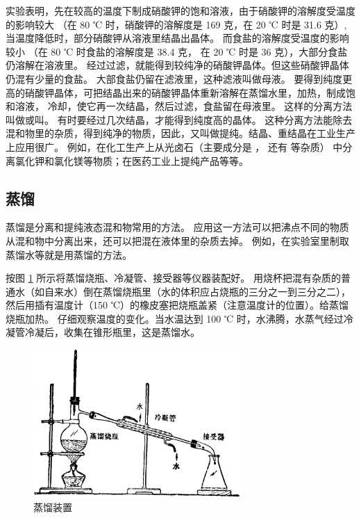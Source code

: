 实验表明，先在较高的温度下制成硝酸钾的饱和溶液，由于硝酸钾的溶解度受温度的影响较大
（在 80 ℃ 时，硝酸钾的溶解度是 169 克，在 20 ℃ 时是 31.6 克）,
当温度降低时，部分硝酸钾从溶液里结晶出晶体。
而食盐的溶解度受温度的影响较小
（在 80 ℃ 时食盐的溶解度是 38.4 克， 在 20 ℃ 时是 36 克），大部分食盐仍溶解在溶液里。
经过过滤，就能得到较纯净的硝酸钾晶体。但这些硝酸钾晶体仍混有少量的食盐。
大部食盐仍留在滤液里，这种滤液叫做母液。
要得到纯度更高的硝酸钾晶体，可把结晶出来的硝酸钾晶体重新溶解在蒸馏水里，加热，制成饱和溶液，
冷却，使它再一次结晶，然后过滤，食盐留在母液里。
这样的分离方法叫做或叫。
有时要经过几次结晶，才能得到纯度高的晶体。
这种分离方法能除去混和物里的杂质，得到纯净的物质，因此，又叫做提纯。结晶、重结晶在工业生产上应用很广。
例如，在化工生产上从光卤石（主要成分是 ， 还有  等杂质）
中分离氯化钾和氯化镁等物质；在医药工业上提纯产品等等。


\subsection{蒸馏}

蒸馏是分离和提纯液态混和物常用的方法。
应用这一方法可以把沸点不同的物质从混和物中分离出来，还可以把混在液体里的杂质去掉。
例如，在实验室里制取蒸馏水等就是用蒸馏的方法。

\begin{shiyan}
    按图 \ref{fig:4-10} 所示将蒸馏烧瓶、冷凝管、接受器等仪器装配好。
    用烧杯把混有杂质的普通水（如自来水）倒在蒸馏烧瓶里（水的体积应占烧瓶的三分之一到三分之二），
    然后用插有温度计（150 ℃）的橡皮塞把烧瓶盖紧（注意温度计的位置）。给蒸馏烧瓶加热。
    仔细观察温度的变化。当水温达到 100 ℃ 时，水沸腾，水蒸气经过冷凝管冷凝后，收集在锥形瓶里，这是蒸馏水。
\end{shiyan}

\begin{figure}[htbp]
    \centering
    \includegraphics[width=8cm]{../pic/czhx1-ch4-10}
    \caption{蒸馏装置}\label{fig:4-10}
\end{figure}

